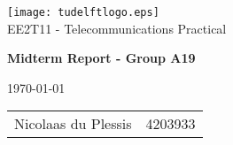 \noindent
\begin{center}
	\texttt{[image: tudelftlogo.eps]} \\
	
	\large{EE2T11 - Telecommunications Practical}\\
	\begin{LARGE}
		\textbf{Midterm Report - Group A19} \\[0.3cm]
	\end{LARGE}
	\today \\[.2cm]
	\begin{tabular}{l l} \\
		Nicolaas du Plessis & 4203933 \\
		
	\end{tabular}
\end{center}

\newpage
